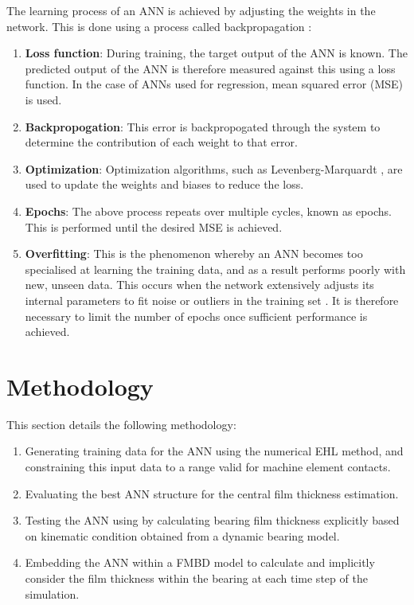 The learning process of an ANN is achieved by adjusting the weights in the network. This is done using a process called backpropagation \cite{Bishop2006}:
\begin{enumerate}
	\item \textbf{Loss function}: During training, the target output of the ANN is known. The predicted output of the ANN is therefore measured against this using a loss function. In the case of ANNs used for regression, mean squared error (MSE) is used.
	\item \textbf{Backpropogation}: This error is backpropogated through the system to determine the contribution of each weight to that error.
	\item \textbf{Optimization}: Optimization algorithms, such as Levenberg-Marquardt \cite{Levenberg1944} \cite{Marquardt1963} \cite{Wilamowski2010}, are used to update the weights and biases to reduce the loss.
	\item \textbf{Epochs}: The above process repeats over multiple cycles, known as epochs. This is performed until the desired MSE is achieved.
	\item \textbf{Overfitting}:  This is the phenomenon whereby an ANN becomes too specialised at learning the training data, and as a result performs poorly with new, unseen data. This occurs when the network extensively adjusts its internal parameters to fit noise or outliers in the training set \cite{Ying2019}. It is therefore necessary to limit the number of epochs once sufficient performance is achieved.
\end{enumerate}

\section{Methodology}

This section details the following methodology:

\begin{enumerate}
	\item Generating training data for the ANN using the numerical EHL method, and constraining this input data to a range valid for machine element contacts.
	\item Evaluating the best ANN structure for the central film thickness estimation.
	\item Testing the ANN using by calculating bearing film thickness explicitly based on kinematic condition obtained from a dynamic bearing model.
	\item Embedding the ANN within a FMBD model to calculate and implicitly consider the film thickness within the bearing at each time step of the simulation.
	
\end{enumerate}


